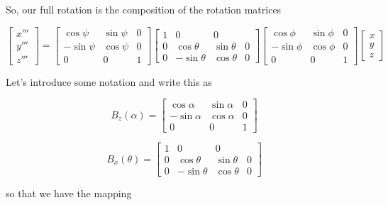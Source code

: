 So, our full rotation is the composition of the rotation matrices

\begin{equation}\label{eqn:classicalMechanicsEulerAngles:80}
\begin{bmatrix}
x''' \\
y''' \\
z'''
\end{bmatrix}
=
\begin{bmatrix}
\cos\psi & \sin\psi & 0 \\
-\sin\psi & \cos\psi & 0 \\
0 & 0 & 1
\end{bmatrix}
\begin{bmatrix}
1 & 0 & 0 \\
0 & \cos\theta & \sin\theta & 0 \\
0 & -\sin\theta & \cos\theta & 0 
\end{bmatrix}
\begin{bmatrix}
\cos\phi & \sin\phi & 0 \\
-\sin\phi & \cos\phi & 0 \\
0 & 0 & 1
\end{bmatrix}
\begin{bmatrix}
x \\
y \\
z
\end{bmatrix}
\end{equation}

Let's introduce some notation and write this as

\begin{equation}\label{eqn:classicalMechanicsEulerAngles:100}
B_z(\alpha)
=
\begin{bmatrix}
\cos\alpha & \sin\alpha & 0 \\
-\sin\alpha & \cos\alpha & 0 \\
0 & 0 & 1
\end{bmatrix}
\end{equation}

\begin{equation}\label{eqn:classicalMechanicsEulerAngles:120}
B_x(\theta) =
\begin{bmatrix}
1 & 0 & 0 \\
0 & \cos\theta & \sin\theta & 0 \\
0 & -\sin\theta & \cos\theta & 0 
\end{bmatrix}
\end{equation}

so that we have the mapping

